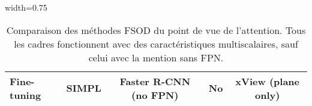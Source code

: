 \begin{table}[h]
\begin{adjustbox}{width=0.75\textwidth}
\begin{tabular}{@{}llccc}
            \multirow{-9}{*}{\cellcolor{white}\parbox{1.5cm}{\textbf{Fine-tuning}}}              & SIMPL \parencite{xu2022simpl}                     & Faster R-CNN (no FPN)      & No                          & xView (plane only)                 \\ \bottomrule[1pt]
            \end{tabular}%
    \end{adjustbox}
    \caption{Comparaison des méthodes FSOD du point de vue de l'attention. Tous les
    cadres fonctionnent avec des caractéristiques multiscalaires, sauf celui avec la
    mention sans FPN.}

\end{table}